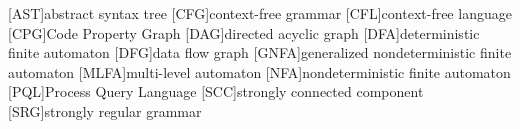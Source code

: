  
\begin{acronym}
	[AST]{abstract syntax tree}
	[CFG]{context-free grammar}
	[CFL]{context-free language}
	[CPG]{Code Property Graph}
	[DAG]{directed acyclic graph}
	[DFA]{deterministic finite automaton}
	[DFG]{data flow graph}
	[GNFA]{generalized nondeterministic finite automaton}
	[MLFA]{multi-level automaton}
	[NFA]{nondeterministic finite automaton}
	[PQL]{Process Query Language}
	[SCC]{strongly connected component}
	[SRG]{strongly regular grammar}
\end{acronym}